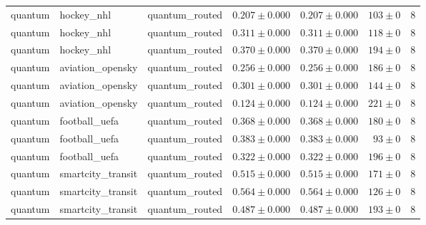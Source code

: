 \begin{table}[htbp]
\begin{tabular}{l l l r r r r}
quantum & hockey\_nhl & quantum\_routed & $0.207\pm0.000$ & $0.207\pm0.000$ & $103\pm0$ & 8 \\
quantum & hockey\_nhl & quantum\_routed & $0.311\pm0.000$ & $0.311\pm0.000$ & $118\pm0$ & 8 \\
quantum & hockey\_nhl & quantum\_routed & $0.370\pm0.000$ & $0.370\pm0.000$ & $194\pm0$ & 8 \\
quantum & aviation\_opensky & quantum\_routed & $0.256\pm0.000$ & $0.256\pm0.000$ & $186\pm0$ & 8 \\
quantum & aviation\_opensky & quantum\_routed & $0.301\pm0.000$ & $0.301\pm0.000$ & $144\pm0$ & 8 \\
quantum & aviation\_opensky & quantum\_routed & $0.124\pm0.000$ & $0.124\pm0.000$ & $221\pm0$ & 8 \\
quantum & football\_uefa & quantum\_routed & $0.368\pm0.000$ & $0.368\pm0.000$ & $180\pm0$ & 8 \\
quantum & football\_uefa & quantum\_routed & $0.383\pm0.000$ & $0.383\pm0.000$ & $93\pm0$ & 8 \\
quantum & football\_uefa & quantum\_routed & $0.322\pm0.000$ & $0.322\pm0.000$ & $196\pm0$ & 8 \\
quantum & smartcity\_transit & quantum\_routed & $0.515\pm0.000$ & $0.515\pm0.000$ & $171\pm0$ & 8 \\
quantum & smartcity\_transit & quantum\_routed & $0.564\pm0.000$ & $0.564\pm0.000$ & $126\pm0$ & 8 \\
quantum & smartcity\_transit & quantum\_routed & $0.487\pm0.000$ & $0.487\pm0.000$ & $193\pm0$ & 8 \\
\hline
\end{tabular}
\end{table}
